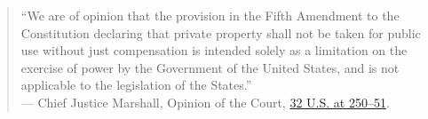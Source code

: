 \documentclass[12pt]{article}
\begin{document}
\begin{quote}
``We are of opinion that the provision in the Fifth Amendment to the Constitution declaring that private property shall not be taken for public use without just compensation is intended solely as a limitation on the exercise of power by the Government of the United States, and is not applicable to the legislation of the States.''\\
--- Chief Justice Marshall, Opinion of the Court, \href{https://supreme.justia.com/cases/federal/us/32/243/}{32 U.S. at 250--51}.
\end{quote}
\end{document}
